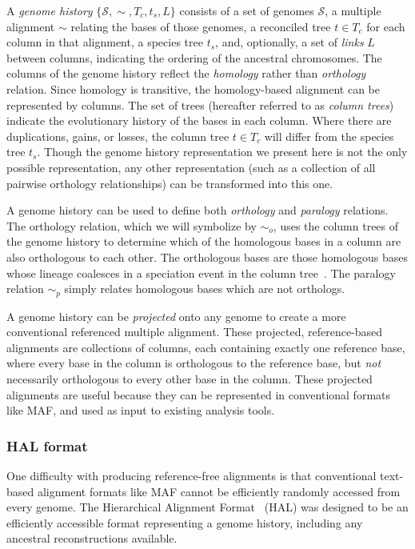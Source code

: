 \documentclass[fleqn,10pt]{wlscirep}
\begin{document}
A \emph{genome history} $\{\mathcal{S}, \sim, T_c, t_s, L\}$ consists of a set of genomes $\mathcal{S}$, a multiple alignment $\sim$ relating the bases of those genomes, a reconciled tree $t \in T_c$ for each column in that alignment, a species tree $t_s$, and, optionally, a set of \emph{links} $L$ between columns, indicating the ordering of the ancestral chromosomes.
The columns of the genome history reflect the \emph{homology} rather than \emph{orthology} relation.
Since homology is transitive, the homology-based alignment can be represented by columns.
The set of trees (hereafter referred to as \emph{column trees}) indicate the evolutionary history of the bases in each column.
Where there are duplications, gains, or losses, the column tree $t \in T_c$ will differ from the species tree $t_s$.
Though the genome history representation we present here is not the only possible representation, any other representation (such as a collection of all pairwise orthology relationships) can be transformed into this one.

A genome history can be used to define both \emph{orthology} and \emph{paralogy} relations.
The orthology relation, which we will symbolize by $\sim_o$, uses the column trees of the genome history to determine which of the homologous bases in a column are also orthologous to each other.
The orthologous bases are those homologous bases whose lineage coalesces in a speciation event in the column tree~\cite{Koonin2005}.
The paralogy relation $\sim_p$ simply relates homologous bases which are not orthologs.

A genome history can be \emph{projected} onto any genome to create a more conventional referenced multiple alignment.
These projected, reference-based alignments are collections of columns, each containing exactly one reference base, where every base in the column is orthologous to the reference base, but \emph{not} necessarily orthologous to every other base in the column.
These projected alignments are useful because they can be represented in conventional formats like MAF, and used as input to existing analysis tools.

\subsubsection{HAL format}
One difficulty with producing reference-free alignments is that conventional text-based alignment formats like MAF cannot be efficiently randomly accessed from every genome. The Hierarchical Alignment Format~\cite{hal} (HAL) was designed to be an efficiently accessible format representing a genome history, including any ancestral reconstructions available.
\end{document}

